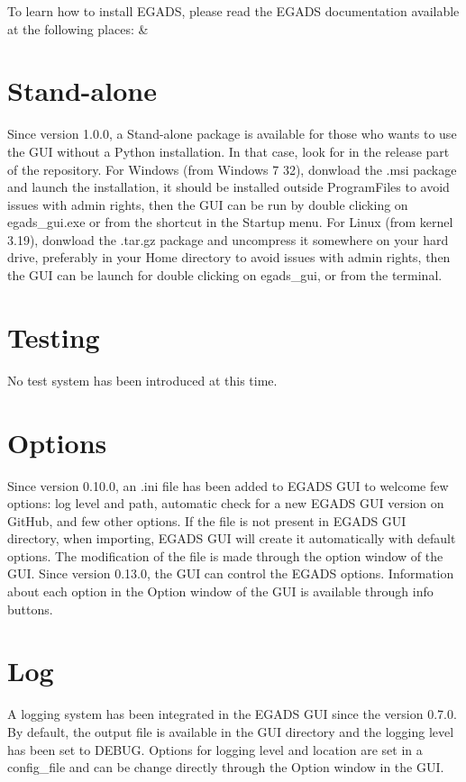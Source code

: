 \documentclass[a4paper,10pt,openany,english]{sphinxmanual}
\begin{document}
To learn how to install EGADS, please read the EGADS documentation available at the following places:  \& 


\section{Stand-alone}
\label{\detokenize{install:stand-alone}}
Since version 1.0.0, a Stand-alone package is available for those who wants to use the GUI without a Python installation. In that case, look for  in the release part of the repository. For Windows (from Windows 7 32), donwload the .msi package and launch the installation, it should be installed outside ProgramFiles to avoid issues with admin rights, then the GUI can be run by double clicking on egads\_gui.exe or from the shortcut in the Startup menu. For Linux (from kernel 3.19), donwload the .tar.gz package and uncompress it somewhere on your hard drive, preferably in your Home directory to avoid issues with admin rights, then the GUI can be launch for double clicking on egads\_gui, or from the terminal.


\section{Testing}
\label{\detokenize{install:testing}}
No test system has been introduced at this time.


\section{Options}
\label{\detokenize{install:options}}
Since version 0.10.0, an .ini file has been added to EGADS GUI to welcome few options: log level and path, automatic check for a new EGADS GUI version on GitHub, and few other options. If the file is not present in EGADS GUI directory, when importing, EGADS GUI will create it automatically with default options. The modification of the file is made through the option window of the GUI. Since version 0.13.0, the GUI can control the EGADS options. Information about each option in the Option window of the GUI is available through info buttons.


\section{Log}
\label{\detokenize{install:log}}
A logging system has been integrated in the EGADS GUI since the version 0.7.0. By default, the output file is available in the GUI directory and the logging level has been set to DEBUG. Options for logging level and location are set in a config\_file  and can be change directly through the Option window in the GUI.
\end{document}
